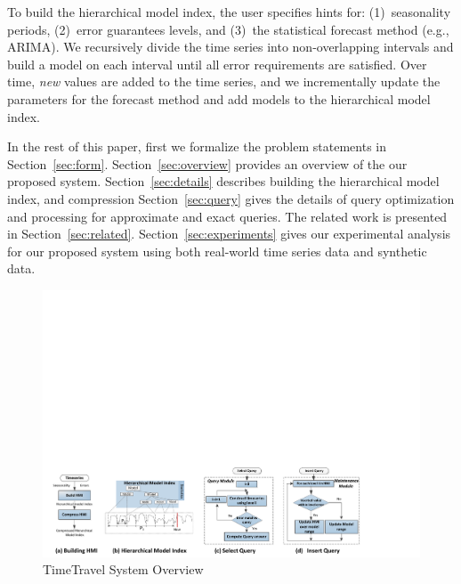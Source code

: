 \documentclass[10pt,conference,letterpaper]{IEEEtran}
\begin{document}
To build the hierarchical model index, the user specifies hints for: (1)~seasonality periods, (2)~error guarantees levels, and (3)~the statistical forecast method (e.g., ARIMA).  
We recursively divide the time series into non-overlapping intervals and build a model on each interval until all error requirements are satisfied. 
Over time, {\it new} values are added to the time series, and we incrementally update the parameters for the forecast method and add  models to the hierarchical model index.

In the rest of this paper, first we formalize the problem statements in Section~\ref{sec:form}.   Section~\ref{sec:overview} provides an overview of the our proposed system. Section~\ref{sec:details} describes building the hierarchical model index, and  compression Section~\ref{sec:query} gives the details of query optimization and processing for approximate and exact queries.  The  related work is presented in Section~\ref{sec:related}. Section~\ref{sec:experiments} gives  our experimental analysis for our proposed system   using  both real-world time series data and synthetic data.

\begin{figure}[th]
\center
\includegraphics[width=6in]{figs/overview3.pdf}
\caption{TimeTravel System Overview}
\label{fig:arch}
\end{figure} 
\end{document}
